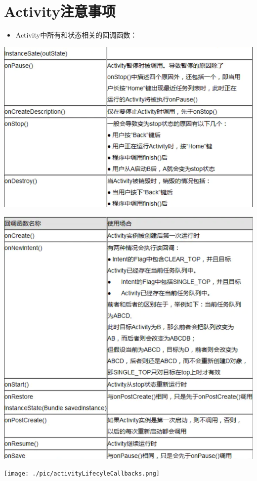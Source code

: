\documentclass[9pt, b5paaper]{book}
\begin{document}
\section{Activity注意事项}
\label{sec-1-2}
\begin{itemize}
\item Activity中所有和状态相关的回调函数：
\end{itemize}

\includegraphics[width=.9\linewidth]{./pic/one.png}

\includegraphics[width=.9\linewidth]{./pic/two.png}

\texttt{[image: ./pic/activityLifecyleCallbacks.png]}
\end{document}
